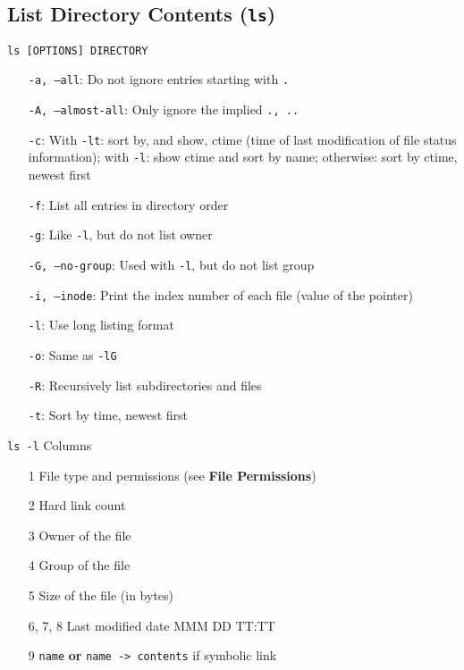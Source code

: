 \documentclass[13pt]{article}
\begin{document}
\subsection{List  Directory Contents (\texttt{ls})}
\texttt{ls [OPTIONS] DIRECTORY}
\begin{itemize}[leftmargin = 0pt]
\item [] \texttt{-a, --all}: Do not ignore entries starting with \texttt{.}
\item [] \texttt{-A, --almost-all}: Only ignore the implied \texttt{., ..}
\item [] \texttt{-c}: With \texttt{-lt}: sort by, and show, ctime (time of last modification of file status information); with \texttt{-l}: show ctime and sort by name; otherwise: sort by ctime, newest first
\item [] \texttt{-f}: List all entries in directory order
\item [] \texttt{-g}: Like \texttt{-l}, but do not list owner
\item [] \texttt{-G, --no-group}: Used with \texttt{-l}, but do not list group
\item [] \texttt{-i, --inode}: Print the index number of each file (value of the pointer)
\item [] \texttt{-l}: Use long listing format
\item [] \texttt{-o}: Same as \texttt{-lG}
\item [] \texttt{-R}: Recursively list subdirectories and files
\item [] \texttt{-t}: Sort by time, newest first
\end{itemize}
\texttt{ls -l} Columns
\begin{itemize}[leftmargin = 0pt]
\item [1] File type and permissions (see \textbf{File Permissions})
\item [2] Hard link count
\item [3] Owner of the file
\item [4] Group of the file
\item [5] Size of the file (in bytes)
\item [6, 7, 8] Last modified date MMM DD TT:TT
\item [9] \texttt{name} \textbf{or} \texttt{name -> contents} if symbolic link
\end{itemize}
\end{document}
